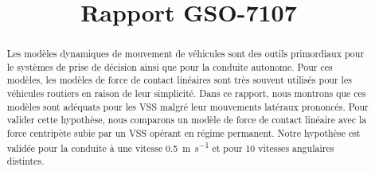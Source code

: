 \documentclass[conference]{IEEEtran}
\begin{document}

\title{Rapport GSO-7107\\}

\author{
}

\maketitle

\begin{abstract}
Les modèles dynamiques de mouvement de véhicules sont des outils primordiaux pour le systèmes de prise de décision ainsi que pour la conduite autonome.
Pour ces modèles, les modèles de force de contact linéaires sont très souvent utilisés pour les véhicules routiers en raison de leur simplicité.
Dans ce rapport, nous montrons que ces modèles sont adéquats pour les \ac{VSS} malgré leur mouvements latéraux prononcés.
Pour valider cette hypothèse, nous comparons un modèle de force de contact linéaire avec la force centripète subie par un \ac{VSS} opérant en régime permanent.
Notre hypothèse est validée pour la conduite à une vitesse \SI{0.5}{\meter\per\second} et pour 10 vitesses angulaires distintes.
\end{abstract}










\printbibliography
\end{document}
